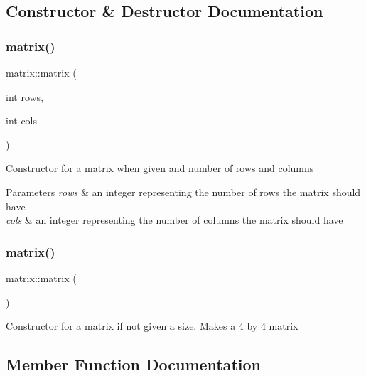 \subsection{Constructor \& Destructor Documentation}
\mbox{\label{classmatrix_a2994d419451e97702e5b1cc12c81d914}} 
\subsubsection{\texorpdfstring{matrix()}{matrix()}\hspace{0.1cm}{\footnotesize\ttfamily [1/2]}}
{\footnotesize\ttfamily matrix\+::matrix (\begin{DoxyParamCaption}\item[{int}]{rows,  }\item[{int}]{cols }\end{DoxyParamCaption})}

Constructor for a matrix when given and number of rows and columns 
\begin{DoxyParams}{Parameters}
{\em rows} & an integer representing the number of rows the matrix should have \\
\hline
{\em cols} & an integer representing the number of columns the matrix should have \\
\hline
\end{DoxyParams}
\mbox{\label{classmatrix_a4daf70b1506ea976352f20e4322a9c17}} 
\subsubsection{\texorpdfstring{matrix()}{matrix()}\hspace{0.1cm}{\footnotesize\ttfamily [2/2]}}
{\footnotesize\ttfamily matrix\+::matrix (\begin{DoxyParamCaption}{ }\end{DoxyParamCaption})}

Constructor for a matrix if not given a size. Makes a 4 by 4 matrix 

\subsection{Member Function Documentation}
\mbox{\label{classmatrix_ae9817c7c1a8855874728c2342f514885}} 
